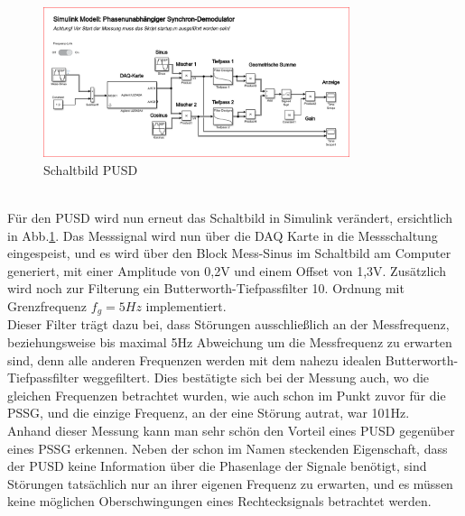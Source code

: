 \begin{figure}[h]
	\centering
	\includegraphics[width=0.8\textwidth]{./img/6_3_6}
	\caption{Schaltbild PUSD}
	\label{fg:schalt_pusd}
\end{figure}
~\\
Für den PUSD wird nun erneut das Schaltbild in Simulink verändert, ersichtlich in Abb.\ref{fg:schalt_pusd}. Das Messsignal wird nun über die DAQ Karte in die Messschaltung eingespeist, und es wird über den Block Mess-Sinus im Schaltbild am Computer generiert, mit einer Amplitude von 0,2V und einem Offset von 1,3V. Zusätzlich wird noch zur Filterung ein Butterworth-Tiefpassfilter 10. Ordnung mit Grenzfrequenz $f_g = 5Hz$ implementiert.
~\\
Dieser Filter trägt dazu bei, dass Störungen ausschließlich an der Messfrequenz, beziehungsweise bis maximal 5Hz Abweichung um die Messfrequenz zu erwarten sind, denn alle anderen Frequenzen werden mit dem nahezu idealen Butterworth-Tiefpassfilter weggefiltert. Dies bestätigte sich bei der Messung auch, wo die gleichen Frequenzen betrachtet wurden, wie auch schon im Punkt zuvor für die PSSG, und die einzige Frequenz, an der eine Störung autrat, war 101Hz.
~\\
Anhand dieser Messung kann man sehr schön den Vorteil eines PUSD gegenüber eines PSSG erkennen. Neben der schon im Namen steckenden Eigenschaft, dass der PUSD keine Information über die Phasenlage der Signale benötigt, sind Störungen tatsächlich nur an ihrer eigenen Frequenz zu erwarten, und es müssen keine möglichen Oberschwingungen eines Rechtecksignals betrachtet werden.















